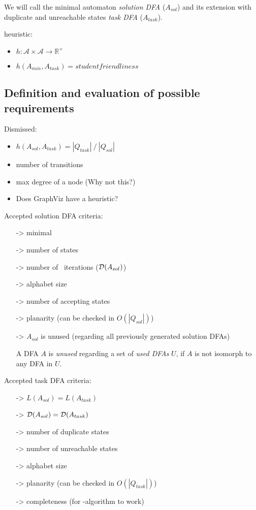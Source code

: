 We will call the minimal automaton \emph{solution DFA} ($A_{sol}$) and its extension with duplicate and unreachable states \emph{task DFA} ($A_{task}$).

heuristic:
\begin{itemize}
	\item $h \colon \mathcal{A} \times \mathcal{A} \to \mathbb{R^+}$
	\item $h(A_{min}, A_{task}) = studentfriendliness$
\end{itemize}

\subsection{Definition and evaluation of possible requirements}

Dismissed:
\begin{itemize}
	\item $h(A_{sol}, A_{task}) = |Q_{task}|\ /\ |Q_{sol}|$
	\item number of transitions
	\item max degree of a node (Why not this?)
	\item Does GraphViz have a heuristic?
\end{itemize}
Accepted solution DFA criteria:
\begin{itemize}
	\item[->] minimal
	\item[->] number of states
	\item[->] number of \MinMark\ iterations ($\mathcal{D}(A_{sol})$)
	\item[->] alphabet size
	\item[->] number of accepting states
	\item[->] planarity (can be checked in $O(|Q_{sol}|)$)
	\item[->] $A_{sol}$ is unused (regarding all previously generated solution DFAs)
	
	\begin{definition} \label{ch:1:unused-dfa}
		A DFA $A$ is \emph{unused} regarding a set of \emph{used DFAs} $U$, if $A$ is not isomorph to any DFA in $U$.
	\end{definition}
\end{itemize}
Accepted task DFA criteria:
\begin{itemize}
	\item[->] $L(A_{sol}) = L(A_{task})$
	\item[->] $\mathcal{D}(A_{sol}) = \mathcal{D}(A_{task})$
	\item[->] number of duplicate states
	\item[->] number of unreachable states
	\item[->] alphabet size
	\item[->] planarity (can be checked in $O(|Q_{task}|)$)
	\item[->] completeness (for \MinMark-algorithm to work)
\end{itemize}


